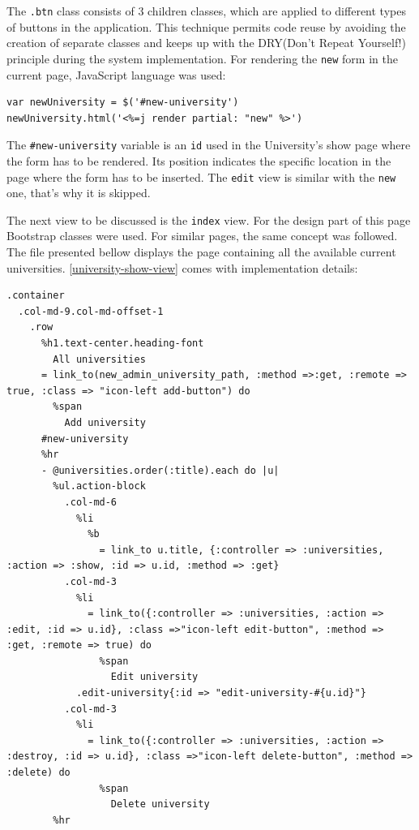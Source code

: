 The \texttt{.btn} class consists of 3 children classes, which are applied to different types of buttons in the application. This technique permits code reuse by avoiding the creation of separate classes and keeps up with the DRY(Don't Repeat Yourself!) principle during the system implementation. For rendering the \texttt{new} form in the current page, JavaScript language was used:

\begin{lstlisting}[style=nonumbers, caption={Render form in current page using Javascript},label={university-new-form-javascript}]
var newUniversity = $('#new-university')
newUniversity.html('<%=j render partial: "new" %>')
\end{lstlisting}
\bigskip

The \texttt{\#new-university} variable is an \texttt{id} used in the University's show page where the form has to be rendered. Its position indicates the specific location in the page where the form has to be inserted. The \texttt{edit} view is similar with the \texttt{new} one, that's why it is skipped. 

The next view to be discussed is the \texttt{index} view. For the design part of this page Bootstrap classes were used. For similar pages, the same concept was followed. The file presented bellow displays the page containing all the available current universities. \autoref{university-show-view} comes with implementation details:

\begin{lstlisting}[caption={Index view of the University instance},label={university-show-view}]
.container
  .col-md-9.col-md-offset-1
    .row
      %h1.text-center.heading-font
        All universities
      = link_to(new_admin_university_path, :method =>:get, :remote => true, :class => "icon-left add-button") do
        %span
          Add university
      #new-university
      %hr
      - @universities.order(:title).each do |u|
        %ul.action-block
          .col-md-6
            %li
              %b
                = link_to u.title, {:controller => :universities, :action => :show, :id => u.id, :method => :get}
          .col-md-3
            %li
              = link_to({:controller => :universities, :action => :edit, :id => u.id}, :class =>"icon-left edit-button", :method => :get, :remote => true) do
                %span
                  Edit university
            .edit-university{:id => "edit-university-#{u.id}"}
          .col-md-3
            %li
              = link_to({:controller => :universities, :action => :destroy, :id => u.id}, :class =>"icon-left delete-button", :method => :delete) do
                %span
                  Delete university
        %hr

\end{lstlisting}
\bigskip

